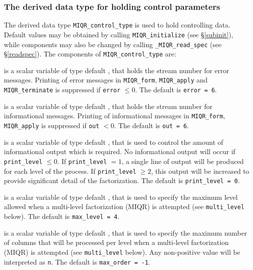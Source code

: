 \documentclass{galahad}
\newcommand{\packagename}{MIQR}
\newcommand{\fullpackagename}{\libraryname\_\packagename}
\begin{document}

\subsubsection{The derived data type for holding control
 parameters}\label{typecontrol}
The derived data type
{\tt \packagename\_control\_type}
is used to hold controlling data. Default values may be obtained by calling
{\tt \packagename\_initialize}
(see \S\ref{subinit}),
while components may also be changed by calling
{\tt \fullpackagename\_read\-\_spec}
(see \S\ref{readspec}).
The components of
{\tt \packagename\_control\_type}
are:

\begin{description}

 is a scalar variable of type default \integer, that holds the
stream number for error messages. Printing of error messages in
{\tt \packagename\_form}, {\tt \packagename\_apply}
and {\tt \packagename\_terminate}
is suppressed if {\tt error} $\leq 0$.
The default is {\tt error = 6}.

 is a scalar variable of type default \integer, that holds the
stream number for informational messages. Printing of informational messages in
{\tt \packagename\_form}, {\tt \packagename\_apply}
is suppressed if {\tt out} $< 0$.
The default is {\tt out = 6}.

 is a scalar variable of type default \integer, that is used
to control the amount of informational output which is required. No
informational output will occur if {\tt print\_level} $\leq 0$. If
{\tt print\_level} $= 1$, a single line of output will be produced for each
level of the process. If {\tt print\_level} $\geq 2$, this output will be
increased to provide significant detail of the factorization.
The default is {\tt print\_level = 0}.

 is a scalar variable of type default \integer, that is used
to specify the maximum level allowed when a multi-level factorization (MIQR)
is attempted (see {\tt multi\_level} below).
The default is {\tt max\_level = 4}.

 is a scalar variable of type default \integer, that is used
to specify the maximum number of columns that will be processed per level
when a multi-level factorization (MIQR) is attempted
(see {\tt multi\_level} below).
Any non-positive value will be interpreted as {\tt n}.
The default is {\tt max\_order = -1}.


\end{description}
\end{document}
